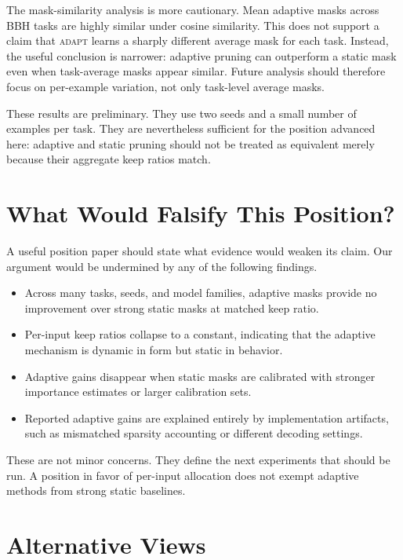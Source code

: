 \documentclass{article}
\newcommand{\method}{\textsc{adapt}}
\begin{document}
The mask-similarity analysis is more cautionary. Mean adaptive masks across
BBH tasks are highly similar under cosine similarity. This does not support a
claim that \method{} learns a sharply different average mask for each task.
Instead, the useful conclusion is narrower: adaptive pruning can outperform a
static mask even when task-average masks appear similar. Future analysis should
therefore focus on per-example variation, not only task-level average masks.

These results are preliminary. They use two seeds and a small number of
examples per task. They are nevertheless sufficient for the position advanced
here: adaptive and static pruning should not be treated as equivalent merely
because their aggregate keep ratios match.

\section{What Would Falsify This Position?}

A useful position paper should state what evidence would weaken its claim. Our
argument would be undermined by any of the following findings.

\begin{itemize}
  \item Across many tasks, seeds, and model families, adaptive masks provide no
        improvement over strong static masks at matched keep ratio.
  \item Per-input keep ratios collapse to a constant, indicating that the
        adaptive mechanism is dynamic in form but static in behavior.
  \item Adaptive gains disappear when static masks are calibrated with stronger
        importance estimates or larger calibration sets.
  \item Reported adaptive gains are explained entirely by implementation
        artifacts, such as mismatched sparsity accounting or different decoding
        settings.
\end{itemize}

These are not minor concerns. They define the next experiments that should be
run. A position in favor of per-input allocation does not exempt adaptive
methods from strong static baselines.

\section{Alternative Views}
\end{document}
